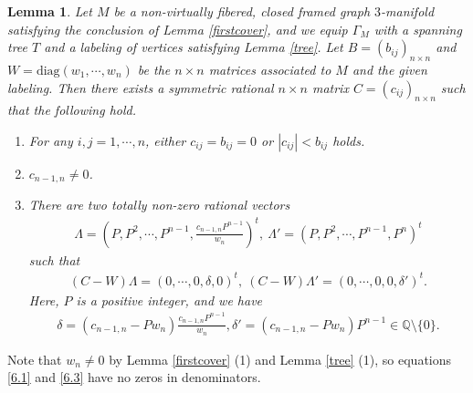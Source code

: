 \documentclass{amsart}
\numberwithin{equation}{section}
\newtheorem{lemma}[theorem]{Lemma}
\theoremstyle{definition}
\begin{document}
\begin{lemma}\label{twosolutions}
Let $M$ be a non-virtually fibered, closed framed graph $3$-manifold satisfying the conclusion of Lemma \ref{firstcover}, and we equip $\Gamma_M$ with a spanning tree $T$ and a labeling of vertices satisfying Lemma \ref{tree}. Let $B=(b_{ij})_{n\times n}$ and $W=\text{diag}(w_1,\cdots,w_n)$ be the $n\times n$ matrices associated to $M$ and the given labeling. Then there exists a symmetric rational $n\times n$ matrix $C=(c_{ij})_{n\times n}$ such that the following hold.
\begin{enumerate}
\item For any $i,j=1,\cdots,n$, either $c_{ij}=b_{ij}=0$ or $|c_{ij}|<b_{ij}$ holds.
\item $c_{n-1,n}\ne 0$.
\item There are two totally non-zero rational vectors 
\begin{align}\label{6.1}
\Lambda=(P,P^2,\cdots,P^{n-1},\frac{c_{n-1,n}P^{n-1}}{w_n})^t,\ \Lambda'=(P,P^2,\cdots,P^{n-1},P^n)^t
\end{align} 
such that 
\begin{align}\label{6.2}
(C-W)\Lambda=(0,\cdots,0,\delta,0)^t,\ (C-W)\Lambda'=(0,\cdots,0,0,\delta')^t.
\end{align}
Here, $P$ is a positive integer, and we have
\begin{align}\label{6.3}
\delta=(c_{n-1,n}-Pw_n)\frac{c_{n-1,n}P^{n-1}}{w_n},\delta'=(c_{n-1,n}-Pw_n)P^{n-1}\in \mathbb{Q}\setminus \{0\}.
\end{align}
\end{enumerate}
\end{lemma}

Note that $w_n\ne 0$ by Lemma \ref{firstcover} (1) and Lemma \ref{tree} (1), so equations \eqref{6.1} and \eqref{6.3} have no zeros in denominators.
\end{document}
